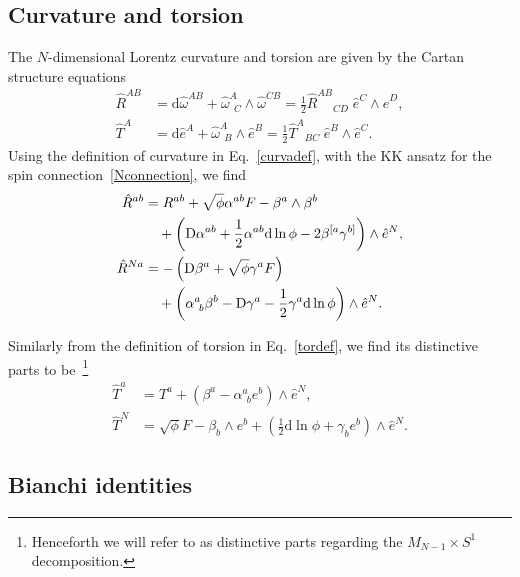 \documentclass[aps,prd,12pt,superscriptaddress,showpacs,showkeys,longbibliography,reprint,nofootinbib]{revtex4-1}
\begin{document}
\subsection{Curvature and torsion}

The $N$-dimensional Lorentz curvature and torsion are given by the Cartan structure equations
\begin{align}
  \label{curvadef}
  \hat{R}^{AB} &= \mbox{d}\hat{\omega}^{AB}+\hat{\omega}^A_{\ \ C}\wedge\hat{\omega}^{CB} = \frac{1}{2} \hat{R}^{AB}{}_{CD} \; \hat{e}^C \wedge \hat{e}^D,\\
  \label{tordef}
  \hat{T}^A &= \mbox{d}\hat{e}^A+\hat{\omega}^A_{\ \ B}\wedge\hat{e}^B = \frac{1}{2} \hat{T}^{A}{}_{BC} \; \hat{e}^B \wedge \hat{e}^C. 
\end{align}
Using the definition of curvature in Eq.~\eqref{curvadef},  with the KK ansatz for the spin connection~\eqref{Nconnection}, we find
\begin{align}
  \label{R1}
  \hat{R}^{ab}&=R^{ab}+\sqrt{\phi}\alpha^{ab}F-\beta^a\wedge\beta^b\notag\\
  & \quad +\left(\mbox{D}\alpha^{ab}+\frac{1}{2}\alpha^{ab}\mbox{d}\ln\phi-2\beta^{[a}\gamma^{b]}\right)\wedge\hat{e}^N,\\
  \label{R2}
  \hat{R}^{Na}&=-\left(\mbox{D}\beta^a+\sqrt{\phi}\gamma^a F\right)\notag\\
  & \quad +\left(\alpha^a_{\ b}\beta^b-\mbox{D}\gamma^a-\frac{1}{2}\gamma^a\mbox{d}\ln\phi\right)\wedge\hat{e}^N.
\end{align}

Similarly from the definition of torsion in Eq.~\eqref{tordef}, we find its distinctive parts to be~\footnote{Henceforth we will refer to as distinctive parts regarding the $M_{N-1}\times S^1$ decomposition.}
\begin{align}\label{T1}
  \hat{T}^a &= T^a+\left(\beta^a-\alpha^a_{\ \ b}e^b\right)\wedge\hat{e}^N,\\
  \label{T2}
  \hat{T}^N &= \sqrt{\phi}F-\beta_b\wedge e^b+\left(\frac{1}{2}\mbox{d}\ln\phi+\gamma_be^b\right)\wedge\hat{e}^N.
\end{align}

\subsection{Bianchi identities\label{sec:bianchi}}
\end{document}
